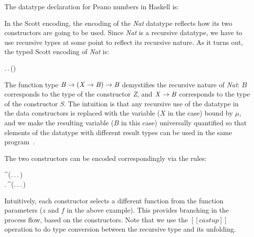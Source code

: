 The datatype declaration for Peano numbers in Haskell is:
\begin{hscode}\SaveRestoreHook
{}%
%
%
\>[4]{}\;\mathrel{=}\mid {}\;\<[E]%
\ColumnHook
\end{hscode}\resethooks
In the Scott encoding, the encoding of the \emph{Nat} datatype
reflects how its two constructors are going to be used. Since
\emph{Nat} is a recursive datatype, we have to use recursive types at
some point to reflect its recursive nature. As it turns out, the typed
Scott encoding of \emph{Nat} is:
\begin{hscode}\SaveRestoreHook
{}%
%
%
\>[3]{}\mu\;\mathbin{:}\star.\,\Pi\;\mathbin{:}\star.\,\to (\to {})\to {}\<[E]%
\ColumnHook
\end{hscode}\resethooks
The function type \ensuremath{\Conid{B}\to (\Conid{X}\to \Conid{B})\to \Conid{B}} demystifies the recursive
nature of \emph{Nat}: $B$ corresponds to the type of the constructor
\emph{Z}, and \ensuremath{\Conid{X}\to \Conid{B}} corresponds to the type of the constructor
\emph{S}. The intuition is that any recursive use of the datatype in
the data constructors is replaced with the variable ($X$ in the case)
bound by $\mu$, and we make the resulting variable ($B$ in this case)
universally quantified so that elements of the datatype with different
result types can be used in the same program~\cite{gadts}.

The two constructors can be encoded correspondingly via the \cast rules:
\begin{hscode}\SaveRestoreHook
{}%
%
%
\>[3]{}\mathrel{=}^\uparrow{}\;(\lambda {}\mathbin{:}\star.\,\lambda {}\mathbin{:}.\,\lambda {}\mathbin{:}\to {}.\,){}\<[E]%
\\
\>[3]{}\mathrel{=}\lambda {}\mathbin{:}.\,^\uparrow{}\;(\lambda {}\mathbin{:}\star.\,\lambda {}\mathbin{:}.\,\lambda {}\mathbin{:}\to {}.\,\;){}\<[E]%
\ColumnHook
\end{hscode}\resethooks
{}
Intuitively, each constructor selects a different function from the
function parameters ($z$ and $f$ in the above example). This provides
branching in the process flow, based on the constructors. Note that we
use the $[[castup]]$ operation to do type conversion between the
recursive type and its unfolding.

